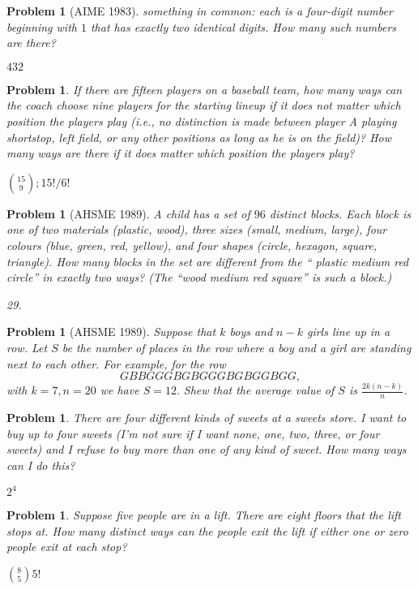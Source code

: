 \documentclass[11pt, openany]{book}
\theoremstyle{change} \theoremheaderfont{\blue\sffamily\bfseries}
\newtheorem{pro}[thm]{Problem}
\theoremstyle{nonumberplain} \theoremheaderfont{\sffamily\bfseries}
\def\binom#1#2{{#1\choose#2}}
\newcommand{\í}{\'{\i}}
\begin{document}
\begin{multicols}{2}
\begin{pro}[AIME 1983]
something in common: each is a four-digit number beginning with $1$
that has exactly two identical digits. How many such numbers are
there?
\begin{answer} $432$
\end{answer}
   \end{pro}
       \begin{pro} If there are fifteen players on a baseball team, how many ways
can the coach choose nine players for the starting lineup if it does
not matter which position the players play (i.e., no distinction is
made between player A playing shortstop, left field, or any other
positions as long as he is on the field)?  How many ways are there
if it does matter which position the players play?\begin{answer}
$\binom{15}{9}; 15!/6!$
\end{answer}
     \end{pro}
   \begin{pro}[AHSME 1989] A child has a set of $96$ distinct
blocks. Each block is one of two materials ({\em plastic, wood}),
three sizes ({\em small, medium, large}), four colours ({\em blue,
green, red, yellow}), and four shapes ({\em circle, hexagon, square,
triangle}). How many blocks in the set are different from the ``{\em
plastic medium red circle}'' in exactly two ways? (The ``{\em wood
medium red square}'' is such a block.) \begin{answer} 29.
\end{answer}
  \end{pro}
       \begin{pro}[AHSME 1989] Suppose that $k$ boys and $n - k$ girls line
up in a row. Let $S$ be the number of places in the row where a boy
and a girl are standing next to each other. For example, for the row
$$GBBGGGBGBGGGBGBGGBGG,$$ with $k = 7, n = 20$ we have $S = 12.$
Shew that the average value of $S$ is $\frac{2k(n - k)}{n}$.
      \end{pro}
           \begin{pro} There are four
different kinds of sweets at a sweets store.  I want to buy up to
four sweets (I'm not sure if I want none, one, two, three, or four
sweets) and I refuse to buy more than one of any kind of sweet. How
many ways can I do this?\begin{answer} $2^4$
\end{answer}
   \end{pro}
          \begin{pro} Suppose five people are in a lift. There are eight floors
that the lift stops at. How many distinct ways can the people exit
the lift if either one or zero people exit at each
stop?\begin{answer} $\binom{8}{5}5!$




\end{answer}
\end{pro}
\end{multicols}
\end{document}
